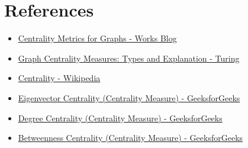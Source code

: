 \documentclass{article}
\begin{document}
\section*{References}

\begin{itemize}
    \item \href{https://www.works.so/blog/developers/centrality-metrics-for-graphs}{Centrality Metrics for Graphs - Works Blog}
    \item \href{https://www.turing.com/kb/graph-centrality-measures}{Graph Centrality Measures: Types and Explanation - Turing}
    \item \href{https://en.wikipedia.org/wiki/Centrality}{Centrality - Wikipedia}
    \item \href{https://www.geeksforgeeks.org/eigenvector-centrality-centrality-measure/}{Eigenvector Centrality (Centrality Measure) - GeeksforGeeks}
    \item \href{https://www.geeksforgeeks.org/degree-centrality-centrality-measure/}{Degree Centrality (Centrality Measure) - GeeksforGeeks}
    \item \href{https://www.geeksforgeeks.org/betweenness-centrality-centrality-measure/}{Betweenness Centrality (Centrality Measure) - GeeksforGeeks}
\end{itemize}
\end{document}
